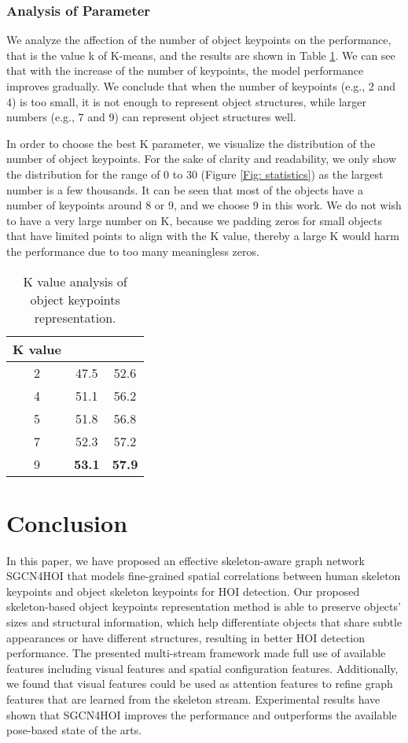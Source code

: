 \documentclass[a4paper, 10pt, conference]{IEEEtran}
\begin{document}
\subsubsection{Analysis of Parameter}
We analyze the affection of the number of object keypoints on the performance, that is the value k of K-means, and the results are shown in Table \ref{kvalue}. We can see that with the increase of the number of keypoints, the model performance improves gradually. We conclude that when the number of keypoints (e.g., 2 and 4) is too small, it is not enough to represent object structures, while larger numbers (e.g., 7 and 9) can represent object structures well.

In order to choose the best K parameter, we visualize the distribution of the number of object keypoints. For the sake of clarity and readability, we only show the distribution for the range of 0 to 30 (Figure \ref{Fig: statistics}) as the largest number is a few thousands. It can be seen that most of the objects have a number of keypoints around 8 or 9, and we choose 9 in this work. We do not wish to have a very large number on K, because we padding zeros for small objects that have limited points to align with the K value, thereby a large K would harm the performance due to too many meaningless zeros.

\begin{table}[htbp]
	\centering
	\caption{K value analysis of object keypoints representation.}
	\label{kvalue}
\setlength{\tabcolsep}{10pt}
	\begin{tabular}{|c| c| c|}\hline
		K value &  &  \\ \hline
		2 & 47.5 & 52.6 \\ \hline
		4 & 51.1 & 56.2 \\ \hline
		5 & 51.8 & 56.8 \\ \hline
		7 & 52.3 & 57.2\\ \hline
		9 & \textbf{53.1} & \textbf{57.9} \\ \hline
    	\end{tabular}
\end{table}

\section{Conclusion}
In this paper, we have proposed an effective skeleton-aware graph network SGCN4HOI that models fine-grained spatial correlations between human skeleton keypoints and object skeleton keypoints for HOI detection. Our proposed skeleton-based object keypoints representation method is able to preserve objects' sizes and structural information, which help differentiate objects that share subtle appearances or have different structures, resulting in better HOI detection performance. The presented multi-stream framework made full use of available features including visual features and spatial configuration features. Additionally, we found that visual features could be used as attention features to refine graph features that are learned from the skeleton stream. Experimental results have shown that SGCN4HOI improves the performance and outperforms the available pose-based state of the arts. 
\end{document}
